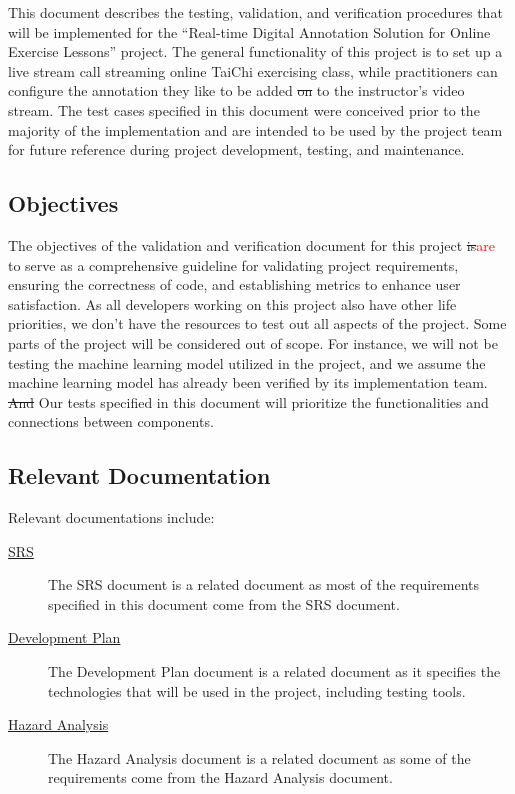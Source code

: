 \documentclass[12pt, titlepage]{article}
\newcommand{\rt}[1]{\textcolor{red}{#1}}
\begin{document}
This document describes the testing, validation, and verification procedures
that will be implemented for the “Real-time Digital Annotation Solution for
Online Exercise Lessons” project. The general functionality of this project is
to set up a live stream call streaming online TaiChi exercising class, while
practitioners can configure the annotation they like to be added \sout{on} to the
instructor’s video stream. The test cases specified in this document were
conceived prior to the majority of the implementation and are intended to be
used by the project team for future reference during project development,
testing, and maintenance.

\subsection{Objectives}

The objectives of the validation and verification document for this project \sout{is}\rt{are}
to serve as a comprehensive guideline for validating project requirements,
ensuring the correctness of code, and establishing metrics to enhance user
satisfaction. As all developers working on this project also have other life
priorities, we don’t have the resources to test out all aspects of the project.
Some parts of the project will be considered out of scope. For instance, we will
not be testing the machine learning model utilized in the project, and we assume
the machine learning model has already been verified by its implementation team.
\sout{And} Our tests specified in this document will prioritize the functionalities and
connections between components.

\subsection{Relevant Documentation}

Relevant documentations include:
\begin{description}
\item[\href{https://github.com/InfiniView-AI/MotionMingle/blob/main/docs/SRS/SRS.pdf}{SRS}]
  The SRS document is a related document as most of the requirements specified
  in this document come from the SRS document.
\item[\href{https://github.com/InfiniView-AI/MotionMingle/blob/main/docs/DevelopmentPlan/DevelopmentPlan.pdf}{Development Plan}]
  The Development Plan document is a related document as it specifies the
  technologies that will be used in the project, including testing tools.
\item[\href{https://github.com/InfiniView-AI/MotionMingle/blob/main/docs/HazardAnalysis/HazardAnalysis.pdf}{Hazard Analysis}]
  The Hazard Analysis document is a related document as some of the requirements
  come from the Hazard Analysis document.
\end{description}
\end{document}
